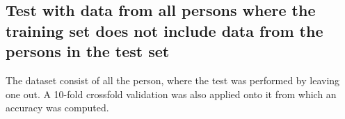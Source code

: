 \subsection{Test with data from all persons where the training set does not 
include data from 
the persons in the test set}

The dataset consist of all the person, where the test was performed by leaving one out. A 10-fold crossfold validation was also applied onto it from which an accuracy was computed. 





